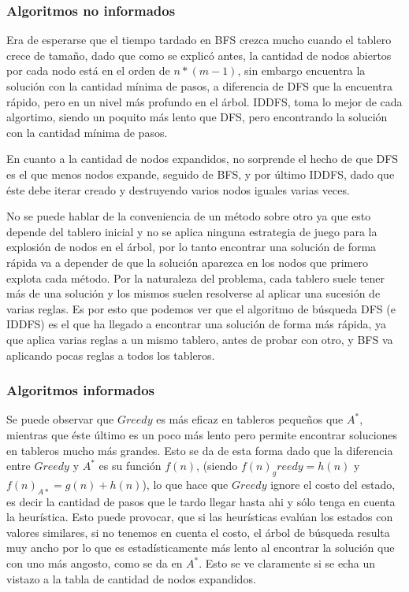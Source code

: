 \documentclass[%
    final,
    reprint,
    notitlepage,
    narroweqnarray,
    inline,
    twoside,
    invited
    ]{ieee}
\begin{document}
\subsubsection{Algoritmos no informados}
\par Era de esperarse que el tiempo tardado en BFS crezca mucho cuando el tablero crece de tama\~no, dado que como se explic\'o antes, la cantidad de nodos abiertos por cada nodo est\'a en el orden de $n*(m-1)$, sin embargo encuentra la soluci\'on con la cantidad m\'inima de pasos, a diferencia de DFS que la encuentra r\'apido, pero en un nivel m\'as profundo en el \'arbol. IDDFS, toma lo mejor de cada algortimo, siendo un poquito m\'as lento que DFS, pero encontrando la soluci\'on con la cantidad m\'inima de pasos.\\
\par En cuanto a la cantidad de nodos expandidos, no sorprende el hecho de que DFS es el que menos nodos expande, seguido de BFS, y por \'ultimo IDDFS, dado que \'este debe iterar creado y destruyendo varios nodos iguales varias veces.\\
\par No se puede hablar de la conveniencia de un m\'etodo sobre otro ya que esto depende del tablero inicial y no se aplica ninguna estrategia de juego para la explosi\'on de nodos en el \'arbol, por lo tanto encontrar una soluci\'on de forma r\'apida va a depender de que la soluci\'on aparezca en los nodos que primero explota cada m\'etodo. Por la naturaleza del problema, cada tablero suele tener m\'as de una soluci\'on y los mismos suelen resolverse al aplicar una sucesi\'on de varias reglas. Es por esto que podemos ver que el algoritmo de b\'usqueda DFS (e IDDFS) es el que ha llegado a encontrar una soluci\'on de forma m\'as r\'apida, ya que aplica varias reglas a un mismo tablero, antes de probar con otro, y BFS va aplicando pocas
reglas a todos los tableros.\\

\subsubsection{Algoritmos informados}
\par Se puede observar que $Greedy$ es m\'as eficaz en tableros peque\~nos que $A^*$, mientras que \'este \'ultimo es un poco m\'as lento pero permite encontrar soluciones en tableros mucho m\'as grandes. Esto se da de esta forma dado que la diferencia entre $Greedy$ y $A^*$ es su funci\'on $f(n)$, (siendo $f(n)_greedy = h(n)$ y $f(n)_{A*} = g(n) + h(n)$), lo que hace que $Greedy$ ignore el costo del estado, es decir la cantidad de pasos que le tardo llegar hasta ahi y s\'olo tenga en cuenta la heur\'istica. Esto puede provocar, que si las heur\'isticas eval\'uan los estados con valores similares, si no tenemos en cuenta el costo, el \'arbol de b\'usqueda resulta muy ancho por lo que es estad\'isticamente m\'as lento al encontrar la soluci\'on que con uno m\'as angosto, como se da en $A^*$. Esto se ve claramente si se echa un vistazo a la tabla de cantidad de nodos expandidos.\\
\end{document}
